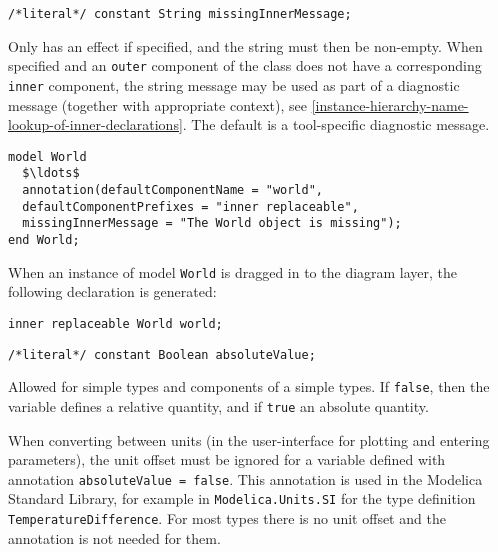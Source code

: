 \begin{annotationdefinition}[missingInnerMessage]
\begin{synopsis}\begin{lstlisting}
/*literal*/ constant String missingInnerMessage;
\end{lstlisting}\end{synopsis}
\begin{semantics}
Only has an effect if specified, and the string must then be non-empty.
When specified and an \lstinline!outer! component of the class does not have a corresponding \lstinline!inner! component, the string message may be used as part of a diagnostic message (together with appropriate context), see \cref{instance-hierarchy-name-lookup-of-inner-declarations}.
The default is a tool-specific diagnostic message.

\begin{example}
\begin{lstlisting}[language=modelica]
model World
  $\ldots$
  annotation(defaultComponentName = "world",
  defaultComponentPrefixes = "inner replaceable",
  missingInnerMessage = "The World object is missing");
end World;
\end{lstlisting}
When an instance of model \lstinline!World! is dragged in to the diagram layer, the following declaration is generated:
\begin{lstlisting}[language=modelica]
inner replaceable World world;
\end{lstlisting}
\end{example}
\end{semantics}
\end{annotationdefinition}

\begin{annotationdefinition}[absoluteValue]
\begin{synopsis}\begin{lstlisting}
/*literal*/ constant Boolean absoluteValue;
\end{lstlisting}\end{synopsis}
\begin{semantics}
Allowed for simple types and components of a simple types.
If \lstinline!false!, then the variable defines a relative quantity, and if \lstinline!true! an absolute quantity.

\begin{nonnormative}
When converting between units (in the user-interface for plotting and entering parameters), the unit offset must be ignored for a variable defined with annotation \lstinline!absoluteValue = false!.
This annotation is used in the Modelica Standard Library, for example in \lstinline!Modelica.Units.SI! for the type definition \lstinline!TemperatureDifference!.
For most types there is no unit offset and the annotation is not needed for them.
\end{nonnormative}
\end{semantics}
\end{annotationdefinition}

